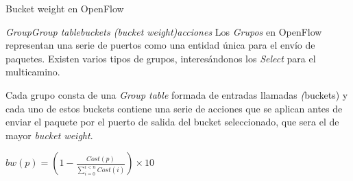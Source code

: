 \documentclass[10pt,spanish,xcolor={svgnames}]{beamer}
\begin{document}
\begin{frame}{Bucket weight en OpenFlow}
\vspace*{-0.1em}
\begin{exampleblock}{\large \emph{Group}\rightarrow \emph{Group table}\rightarrow \emph{buckets (bucket weight)}\rightarrow \emph{acciones}}
\vspace*{1em}
Los \emph{Grupos} en OpenFlow representan una serie de puertos como una entidad única para el envío de paquetes. Existen varios tipos de grupos, interesándonos los \emph{Select} para el multicamino. 
\vspace*{0.6em}

Cada grupo consta de una \emph{Group table} formada de entradas llamadas \emph(buckets) y cada uno de estos buckets contiene una serie de acciones que se aplican antes de enviar el paquete por el puerto de salida del bucket seleccionado, que sera el de mayor \emph{bucket weight}.
\vspace*{1em}

$bw(p) = \left( 1 - \frac{Cost(p)}{\sum_{i=0}^{i<n} Cost(i)}\right)\times{10}$
\end{exampleblock}
\end{frame}
\end{document}
